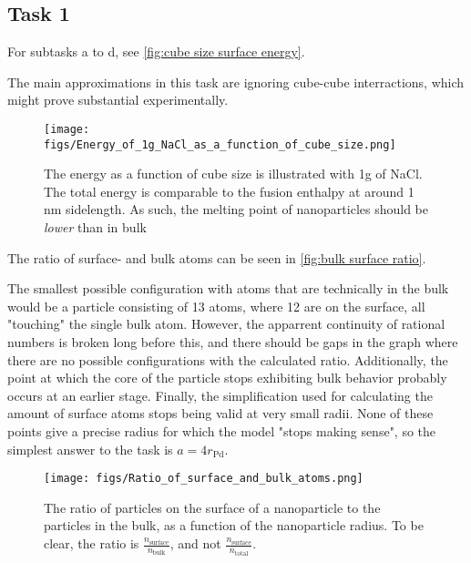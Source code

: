 







\subsection*{Task 1}

    For subtasks a to d, see \autoref{fig:cube size surface energy}.

    The main approximations in this task are ignoring cube-cube interractions, 
    which might prove substantial experimentally.

    \begin{figure}[bh]
        \texttt{[image: figs/Energy\_of\_1g\_NaCl\_as\_a\_function\_of\_cube\_size.png]}

        \caption{The energy as a function of cube size is 
        illustrated with 1g of NaCl. 
        The total energy is comparable to the fusion enthalpy at 
        around 1 nm sidelength. 
        As such, the melting point of nanoparticles should be 
        \textit{lower} than in bulk}
        \label{fig:cube size surface energy}
    \end{figure}

    The ratio of surface- and bulk atoms can be seen in \autoref{fig:bulk surface ratio}.

    The smallest possible configuration with atoms that are technically in the bulk
    would be a particle consisting of 13 atoms, where 12 are on the surface, 
    all "touching" the single bulk atom. 
    However, the apparrent continuity of rational numbers is 
    broken long before this, and there should be gaps in the graph
    where there are no possible configurations with the calculated ratio.
    Additionally, the point at which the core of the particle stops
    exhibiting bulk behavior probably occurs at an earlier stage. 
    Finally, the simplification used for calculating the amount of
    surface atoms stops being valid at very small radii. 
    None of these points give a precise radius for which the model
    "stops making sense", so the simplest answer to the task is $a = 4r_{\text{Pd}}$.

    \begin{figure}[h]
        \texttt{[image: figs/Ratio\_of\_surface\_and\_bulk\_atoms.png]}

        \caption{The ratio of particles on the surface of a nanoparticle
        to the particles in the bulk, as a function of the nanoparticle radius.
        To be clear, the ratio is $\frac{n_\text{surface}}{n_\text{bulk}}$, 
        and not $\frac{n_\text{surface}}{n_\text{total}}$.
        }
        \label{fig:bulk surface ratio}
    \end{figure}

